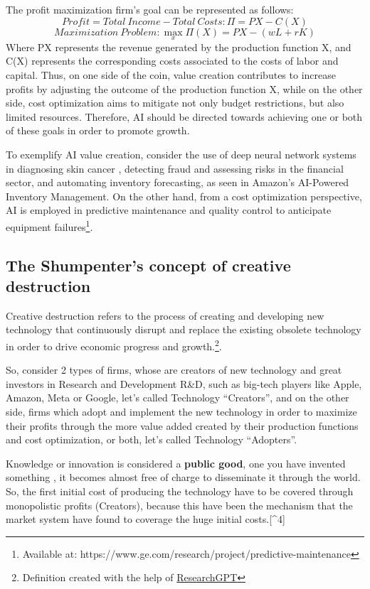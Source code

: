 \documentclass[preprint, 3p,
authoryear]{elsarticle} %
\begin{document}
The profit maximization firm's goal can be represented as follows: \[
Profit = Total \ Income - Total \ Costs: \Pi = PX - C(X)
\] \[
Maximization \ Problem: \max_{x} \Pi(X) = PX - (wL + rK)
\] Where PX represents the revenue generated by the production function
X, and C(X) represents the corresponding costs associated to the costs
of labor and capital. Thus, on one side of the coin, value creation
contributes to increase profits by adjusting the outcome of the
production function X, while on the other side, cost optimization aims
to mitigate not only budget restrictions, but also limited resources.
Therefore, AI should be directed towards achieving one or both of these
goals in order to promote growth.

To exemplify AI value creation, consider the use of deep neural network
systems in diagnosing skin cancer \citep{cancer}, detecting fraud and
assessing risks in the financial sector, and automating inventory
forecasting, as seen in Amazon's AI-Powered Inventory Management. On the
other hand, from a cost optimization perspective, AI is employed in
predictive maintenance and quality control to anticipate equipment
failures\footnote{Available at:
  https://www.ge.com/research/project/predictive-maintenance}.

\hypertarget{the-shumpenters-concept-of-creative-destruction}{%
\subsection{The Shumpenter's concept of creative
destruction}\label{the-shumpenters-concept-of-creative-destruction}}

Creative destruction refers to the process of creating and developing
new technology that continuously disrupt and replace the existing
obsolete technology in order to drive economic progress and
growth.\footnote{Definition created with the help of
  \href{https://github.com/mukulpatnaik/researchgpt.git}{ResearchGPT}}.

So, consider 2 types of firms, whose are creators of new technology and
great investors in Research and Development R\&D, such as big-tech
players like Apple, Amazon, Meta or Google, let's called Technology
``Creators'', and on the other side, firms which adopt and implement the
new technology in order to maximize their profits through the more value
added created by their production functions and cost optimization, or
both, let's called Technology ``Adopters''.

Knowledge or innovation is considered a \textbf{public good}, one you
have invented something , it becomes almost free of charge to
disseminate it through the world. So, the first initial cost of
producing the technology have to be covered through monopolistic profits
(Creators), because this have been the mechanism that the market system
have found to coverage the huge initial costs.{[}\^{}4{]}
\end{document}
